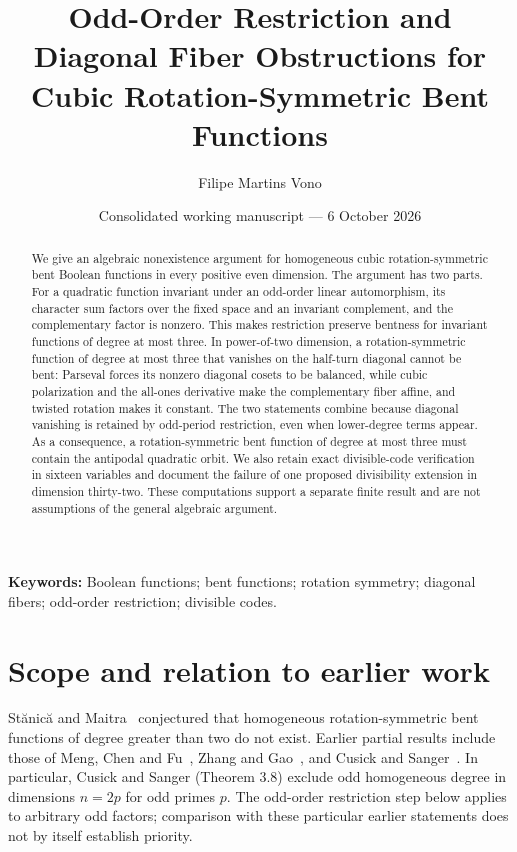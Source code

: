 \documentclass[11pt,a4paper]{article}
\title{Odd-Order Restriction and Diagonal Fiber Obstructions for Cubic Rotation-Symmetric Bent Functions}
\author{Filipe Martins Vono}
\date{Consolidated working manuscript --- 6 October 2026}
\begin{document}
\maketitle
\begin{abstract}
We give an algebraic nonexistence argument for homogeneous cubic rotation-symmetric bent Boolean functions in every positive even dimension. The argument has two parts. For a quadratic function invariant under an odd-order linear automorphism, its character sum factors over the fixed space and an invariant complement, and the complementary factor is nonzero. This makes restriction preserve bentness for invariant functions of degree at most three. In power-of-two dimension, a rotation-symmetric function of degree at most three that vanishes on the half-turn diagonal cannot be bent: Parseval forces its nonzero diagonal cosets to be balanced, while cubic polarization and the all-ones derivative make the complementary fiber affine, and twisted rotation makes it constant. The two statements combine because diagonal vanishing is retained by odd-period restriction, even when lower-degree terms appear. As a consequence, a rotation-symmetric bent function of degree at most three must contain the antipodal quadratic orbit. We also retain exact divisible-code verification in sixteen variables and document the failure of one proposed divisibility extension in dimension thirty-two. These computations support a separate finite result and are not assumptions of the general algebraic argument.
\end{abstract}
\noindent\textbf{Keywords:} Boolean functions; bent functions; rotation symmetry; diagonal fibers; odd-order restriction; divisible codes.

\section{Scope and relation to earlier work}
St\u{a}nic\u{a} and Maitra~\cite{stanica} conjectured that homogeneous rotation-symmetric bent functions of degree greater than two do not exist. Earlier partial results include those of Meng, Chen and Fu~\cite{meng}, Zhang and Gao~\cite{zhang}, and Cusick and Sanger~\cite{cusick}. In particular, Cusick and Sanger (Theorem 3.8) exclude odd homogeneous degree in dimensions $n=2p$ for odd primes $p$. The odd-order restriction step below applies to arbitrary odd factors; comparison with these particular earlier statements does not by itself establish priority.
\end{document}
